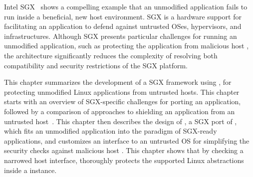 Intel SGX~\cite{intelsgx} shows a compelling example that an unmodified application fails to run inside a beneficial, new host environment.
SGX is a hardware support
for facilitating an application to defend against untrusted OSes, hypervisors, and infrastructures.
Although SGX presents particular challenges for running an unmodified application, such as protecting the application
from malicious host \linuxapis{},
the \graphene{} architecture significantly reduces the complexity
of resolving both compatibility and security restrictions of the SGX platform.


This chapter summarizes the development of a SGX framework using \graphene{}, for protecting unmodified Linux applications from untrusted hosts.
This chapter starts with an overview of SGX-specific challenges
for porting an application,
followed by a comparison of approaches to shielding an application from an untrusted host~\cite{osdi16scone,shinde17panoply,baumann14haven}.
This chapter then describes the design of \graphenesgx{},
a SGX port of \graphene{},
which fits an unmodified application into the paradigm of SGX-ready applications,
and customizes an interface to an untrusted OS
for simplifying the security checks against malicious host \linuxapis{}.
This chapter shows
that by checking a narrowed host interface,
\graphene{} thoroughly protects the supported Linux abstractions inside a \thelibos{} instance.
